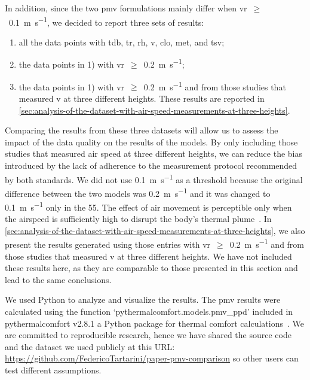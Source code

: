 In addition, since the two \ac{pmv} formulations mainly differ when \ac{vr}~$\geq$~\qty{0.1}{\m\per\s}, we decided to report three sets of results:
\begin{enumerate}[ {}1{)} ]
    \item all the data points with \ac{tdb}, \ac{tr}, \ac{rh}, \ac{v}, \ac{clo}, \ac{met}, and \ac{tsv};
    \item the data points in 1) with \ac{vr}~$\geq$~\qty{0.2}{\m\per\s};
    \item the data points in 1) with \ac{vr}~$\geq$~\qty{0.2}{\m\per\s} and from those studies that measured \ac{v} at three different heights.
    These results are reported in \ref{sec:analysis-of-the-dataset-with-air-speed-measurements-at-three-heights}.
\end{enumerate}
Comparing the results from these three datasets will allow us to assess the impact of the data quality on the results of the models.
By only including those studies that measured air speed at three different heights, we can reduce the bias introduced by the lack of adherence to the measurement protocol recommended by both standards.
We did not use \qty{0.1}{\m\per\s} as a threshold because the original difference between the two models was \qty{0.2}{\m\per\s} and it was changed to \qty{0.1}{\m\per\s} only in the \gls{55}.
The effect of air movement is perceptible only when the airspeed is sufficiently high to disrupt the body's thermal plume~\cite{zukowska_impact_2012}.
In \ref{sec:analysis-of-the-dataset-with-air-speed-measurements-at-three-heights}, we also present the results generated using those entries with \ac{vr}~$\geq$~\qty{0.2}{\m\per\s} and from those studies that measured \ac{v} at three different heights.
We have not included these results here, as they are comparable to those presented in this section and lead to the same conclusions.

We used Python to analyze and visualize the results.
The \ac{pmv} results were calculated using the function `pythermalcomfort.models.pmv\_ppd' included in pythermalcomfort v2.8.1 a Python package for thermal comfort calculations~\cite{Tartarini2020a}.
We are committed to reproducible research, hence we have shared the source code and the dataset we used publicly at this URL: \url{https://github.com/FedericoTartarini/paper-pmv-comparison} so other users can test different assumptions.

